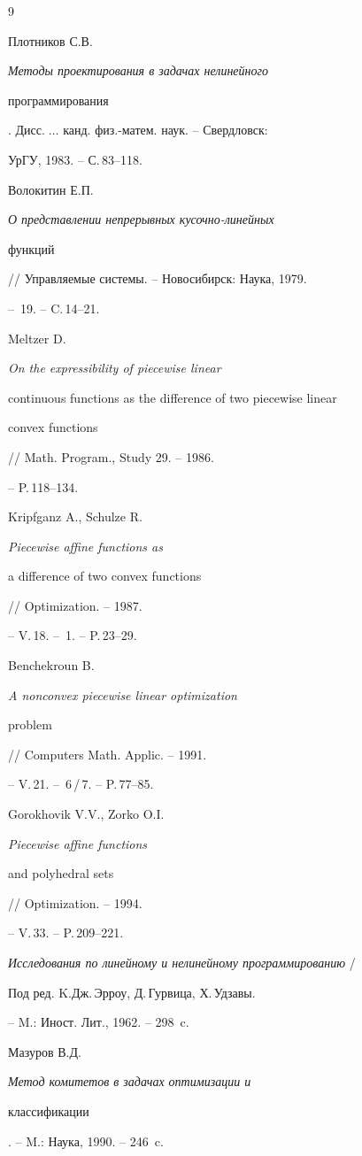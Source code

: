 \begin{thebibliography}{9} 







Плотников С.В. {\em Методы проектирования в задачах нелинейного


программирования}. Дисс.$\;\dotsc$ канд. физ.-матем. наук. -- Свердловск:


УрГУ, 1983. -- С.\,83--118.




Волокитин Е.П. {\em О представлении непрерывных кусочно-линейных


функций} // Управляемые системы. -- Новосибирск: Наука, 1979.


-- \No\,19. -- C.\,14--21.




Meltzer D. {\em On the expressibility of piecewise linear


continuous functions as the difference of two piecewise linear


convex functions} // Math. Program., Study 29. -- 1986.


-- P.\,118--134.




Kripfganz A., Schulze R. {\em Piecewise affine functions as


a difference of two convex functions} // Optimization. -- 1987.


-- V.\,18. -- \No\,1. -- P.\,23--29.




Benchekroun B. {\em A nonconvex piecewise linear optimization


problem} // Computers Math. Applic. -- 1991.


-- V.\,21. -- \No\,6\,/\,7. -- P.\,77--85.




Gorokhovik V.V., Zorko O.I. {\em Piecewise affine functions


and polyhedral sets} // Optimization. -- 1994.


-- V.\,33. -- P.\,209--221.




{\em Исследования по линейному и нелинейному программированию} /


Под ред. K.Дж.\,Эрроу, Д.\,Гурвица, Х.\,Удзавы.


-- M.: Иност. Лит., 1962. -- 298~c.




Мазуров В.Д. {\em Метод комитетов в задачах оптимизации и


классификации}. -- M.: Наука, 1990. -- 246~c.





\end{thebibliography} 


